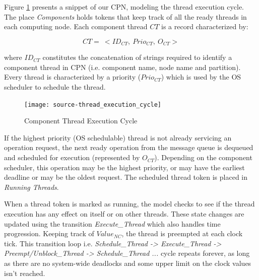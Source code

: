 Figure \ref{fig:Thread_Execution} presents a snippet of our CPN, modeling the thread execution cycle. The place \emph{Components} holds tokens that keep track of all the ready threads in each computing node. Each component thread $CT$ is a record characterized by:

\begin{equation}
\label{eq:CT}
CT = \ <ID_{CT}, \ Prio_{CT}, \ O_{CT}>
\end{equation}

where $ID_{CT}$ constitutes the concatenation of strings required to identify a component thread in CPN (i.e. component name, node name and partition). Every thread is characterized by a priority ($Prio_{CT}$) which is used by the OS scheduler to schedule the thread. 

\begin{figure}[htb]
	\centering
	\texttt{[image: source-thread\_execution\_cycle]}
	\caption{Component Thread Execution Cycle}
	\label{fig:Thread_Execution}
\end{figure}

If the highest priority (OS schedulable) thread is not already servicing an operation request, the next ready operation from the message queue is dequeued and scheduled for execution (represented by $O_{CT}$). Depending on the component scheduler, this operation may be the highest priority, or may have the earliest deadline or may be the oldest request. The scheduled thread token is placed in \emph{Running Threads}. %

When a thread token is marked as running, the model checks to see if the thread execution has any effect on itself or on other threads. These state changes are updated using the transition \emph{Execute\_Thread} which also handles time progression. Keeping track of $Value_{NC}$, the thread is preempted at each clock tick. This transition loop i.e. \emph{Schedule\_Thread -> Execute\_Thread -> Preempt/Unblock\_Thread -> Schedule\_Thread ...} cycle repeats forever, as long as there are no system-wide deadlocks and some upper limit on the clock values isn't reached.


